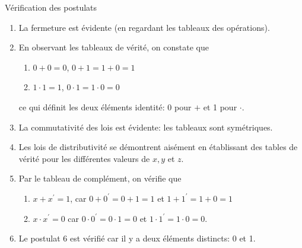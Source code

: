 \documentclass[presentation]{beamer}
\begin{document}
\begin{frame}[label={sec:org6e29258}]{Vérification des postulats}
\begin{enumerate}
\item La fermeture est évidente (en regardant les tableaux des opérations).

\item En observant les tableaux de vérité, on constate que

\begin{enumerate}
\item \(0 + 0 = 0\), \(0 + 1 = 1 + 0 = 1\)

\item \(1 \cdot 1 = 1\), \(0 \cdot 1 = 1 \cdot 0 = 0\)
\end{enumerate}

ce qui définit les deux éléments identité: 0 pour \(+\) et 1 pour  \(\cdot\).

\item La commutativité des lois est évidente: les tableaux sont
symétriques.

\item Les lois de distributivité se démontrent aisément en établissant des
tables de vérité pour les différentes valeurs de \(x, y\) et \(z\).

\item Par le tableau de complément, on vérifie que

\begin{enumerate}
\item \(x + x^{\prime} = 1\), car \(0 + 0^{\prime} = 0 + 1 = 1\) et \(1 +
        1^{\prime} = 1+ 0 = 1\)

\item \(x \cdot x^{\prime} = 0\) car \(0 \cdot 0^{\prime} = 0 \cdot 1 =
        0\) et \(1 \cdot 1^{\prime} = 1 \cdot 0 = 0\).
\end{enumerate}

\item Le postulat 6 est vérifié car il y a deux éléments distincts: 0 et 1.
\end{enumerate}
\end{frame}
\end{document}
